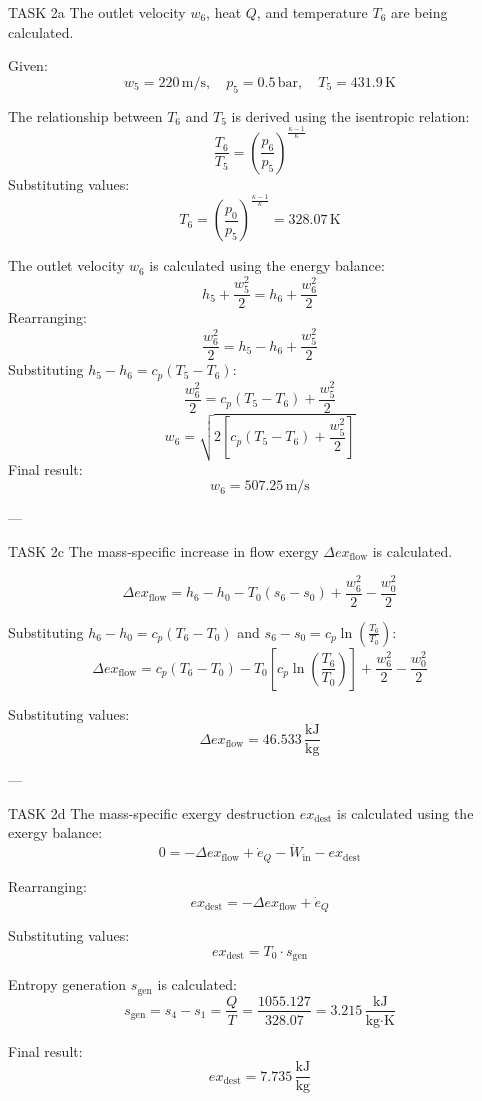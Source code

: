 TASK 2a  
The outlet velocity \( w_6 \), heat \( Q \), and temperature \( T_6 \) are being calculated.  

Given:  
\[
w_5 = 220 \, \text{m/s}, \quad p_5 = 0.5 \, \text{bar}, \quad T_5 = 431.9 \, \text{K}
\]  

The relationship between \( T_6 \) and \( T_5 \) is derived using the isentropic relation:  
\[
\frac{T_6}{T_5} = \left( \frac{p_6}{p_5} \right)^{\frac{\kappa-1}{\kappa}}
\]  
Substituting values:  
\[
T_6 = \left( \frac{p_0}{p_5} \right)^{\frac{\kappa-1}{\kappa}} = 328.07 \, \text{K}
\]  

The outlet velocity \( w_6 \) is calculated using the energy balance:  
\[
h_5 + \frac{w_5^2}{2} = h_6 + \frac{w_6^2}{2}
\]  
Rearranging:  
\[
\frac{w_6^2}{2} = h_5 - h_6 + \frac{w_5^2}{2}
\]  
Substituting \( h_5 - h_6 = c_p(T_5 - T_6) \):  
\[
\frac{w_6^2}{2} = c_p(T_5 - T_6) + \frac{w_5^2}{2}
\]  
\[
w_6 = \sqrt{2 \left[ c_p(T_5 - T_6) + \frac{w_5^2}{2} \right]}
\]  
Final result:  
\[
w_6 = 507.25 \, \text{m/s}
\]  

---

TASK 2c  
The mass-specific increase in flow exergy \( \Delta ex_{\text{flow}} \) is calculated.  

\[
\Delta ex_{\text{flow}} = h_6 - h_0 - T_0(s_6 - s_0) + \frac{w_6^2}{2} - \frac{w_0^2}{2}
\]  

Substituting \( h_6 - h_0 = c_p(T_6 - T_0) \) and \( s_6 - s_0 = c_p \ln \left( \frac{T_6}{T_0} \right) \):  
\[
\Delta ex_{\text{flow}} = c_p(T_6 - T_0) - T_0 \left[ c_p \ln \left( \frac{T_6}{T_0} \right) \right] + \frac{w_6^2}{2} - \frac{w_0^2}{2}
\]  

Substituting values:  
\[
\Delta ex_{\text{flow}} = 46.533 \, \frac{\text{kJ}}{\text{kg}}
\]  

---

TASK 2d  
The mass-specific exergy destruction \( ex_{\text{dest}} \) is calculated using the exergy balance:  
\[
0 = -\Delta ex_{\text{flow}} + \dot{e}_Q - \dot{W}_{\text{in}} - ex_{\text{dest}}
\]  

Rearranging:  
\[
ex_{\text{dest}} = -\Delta ex_{\text{flow}} + \dot{e}_Q
\]  

Substituting values:  
\[
ex_{\text{dest}} = T_0 \cdot s_{\text{gen}}
\]  

Entropy generation \( s_{\text{gen}} \) is calculated:  
\[
s_{\text{gen}} = s_4 - s_1 = \frac{Q}{T} = \frac{1055.127}{328.07} = 3.215 \, \frac{\text{kJ}}{\text{kg·K}}
\]  

Final result:  
\[
ex_{\text{dest}} = 7.735 \, \frac{\text{kJ}}{\text{kg}}
\]  